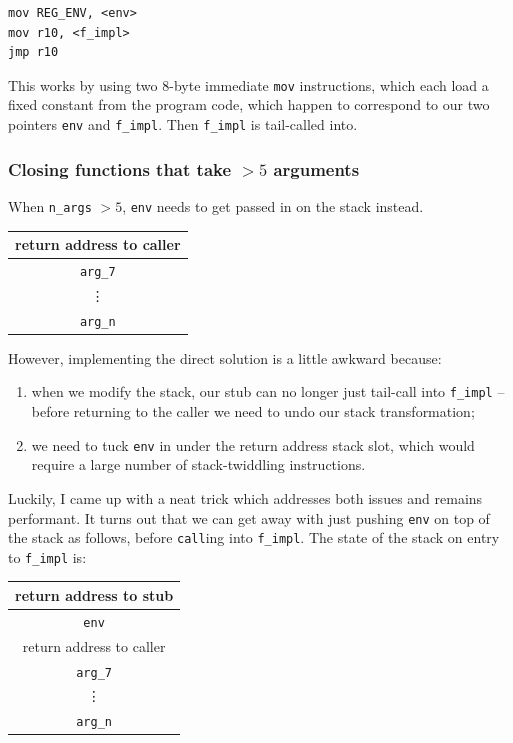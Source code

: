 \documentclass[12pt,a4paper,twoside,openright]{report}
\begin{document}
\begin{lstlisting}
mov REG_ENV, <env>
mov r10, <f_impl>
jmp r10
\end{lstlisting}

This works by using two 8-byte immediate \lstinline!mov! instructions, which
each load a fixed constant from the program code, which happen to correspond to
our two pointers \lstinline!env! and \lstinline!f_impl!.
Then \lstinline!f_impl! is tail-called into.

\subsubsection{Closing functions that take $> 5$ arguments}

When \lstinline!n_args! $> 5$, \lstinline!env! needs to get passed in on the
stack instead.

\begin{tabular}{c}
  return address to caller
  \\ \hline\hline
  \lstinline!arg_7!
  \\ \hline
  \vdots
  \\ \hline
  \lstinline!arg_n!
\end{tabular}

However, implementing the direct solution is a little awkward because:
\begin{enumerate}
  \item when we modify the stack, our stub can no longer just tail-call
    into \lstinline!f_impl! -- before returning to the caller we need to undo
    our stack transformation;
  \item we need to tuck \lstinline!env! in under the return address
    stack slot, which would require a large number of stack-twiddling
    instructions.
\end{enumerate}

Luckily, I came up with a neat trick which addresses both issues and remains
performant. It turns out that we can get away with just pushing \lstinline!env!
on top of the stack as follows, before \lstinline!call!ing into
\lstinline!f_impl!. The state of the stack on entry to \lstinline!f_impl! is:

\begin{tabular}{c}
  return address to stub
  \\ \hline\hline
  \lstinline!env!
  \\ \hline
  return address to caller
  \\ \hline
  \lstinline!arg_7!
  \\ \hline
  \vdots
  \\ \hline
  \lstinline!arg_n!
\end{tabular}
\end{document}
